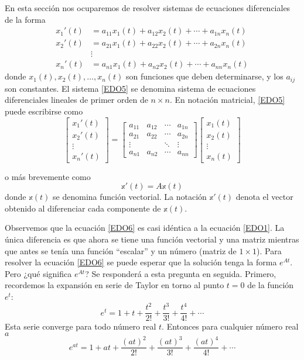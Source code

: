 En esta sección nos ocuparemos de resolver sistemas de ecuaciones diferenciales de la forma
\begin{equation}
    \begin{aligned}
        x_1'(t) & = a_{11} x_1(t) + a_{12} x_2(t) + \cdots + a_{1n} x_n(t) \\
        x_2'(t) & = a_{21} x_1(t) + a_{22} x_2(t) + \cdots + a_{2n} x_n(t) \\
        & \vdots \\
        x_n'(t) & = a_{n1} x_1(t) + a_{n2} x_2(t) + \cdots + a_{nn} x_n(t)
    \end{aligned} \label{EDO5}
\end{equation}
donde $x_1(t), x_2(t), \dots, x_n(t)$ son funciones que deben determinarse, y los $a_{ij}$ son constantes. El sistema \eqref{EDO5} se denomina sistema de ecuaciones diferenciales lineales de primer orden de $n \times n$. En notación matricial, \eqref{EDO5} puede escribirse como
$$\begin{bmatrix}
    x_1'(t) \\
    x_2'(t) \\
    \vdots \\
    x_n'(t)
\end{bmatrix} = \begin{bmatrix}
    a_{11} & a_{12} & \cdots & a_{1n} \\
    a_{21} & a_{22} & \cdots & a_{2n} \\
    \vdots & & \ddots & \vdots \\
    a_{n1} & a_{n2} & \cdots & a_{nn}
\end{bmatrix} \begin{bmatrix}
    x_1(t) \\
    x_2(t) \\
    \vdots \\
    x_n(t)
\end{bmatrix}$$

\newpage\noindent
o más brevemente como
\begin{equation}
    \mathbb{x}'(t) = A\mathbb{x}(t) \label{EDO6}
\end{equation}
donde $\mathbb{x}(t)$ se denomina función vectorial. La notación $\mathbb{x}'(t)$ denota el vector obtenido al diferenciar cada componente de $\mathbb{x}(t)$.

Observemos que la ecuación \eqref{EDO6} es casi idéntica a la ecuación \eqref{EDO1}. La única diferencia es que ahora se tiene una función vectorial y una matriz mientras que antes se tenía una función “escalar” y un número (matriz de $1 \times 1$). Para resolver la ecuación \eqref{EDO6} se puede esperar que la solución tenga la forma $e^{At}$. Pero ¿qué significa $e^{At}$? Se responderá a esta pregunta en seguida. Primero, recordemos la expansión en serie de Taylor en torno al punto $t = 0$ de la función $e^t$:
$$e^t = 1 + t + \frac{t^2}{2!} + \frac{t^3}{3!} + \frac{t^4}{4!} + \cdots$$
Esta serie converge para todo número real $t$. Entonces para cualquier número real $a$
$$e^{at} = 1 + at + \frac{(at)^2}{2!} + \frac{(at)^3}{3!} + \frac{(at)^4}{4!} + \cdots$$

